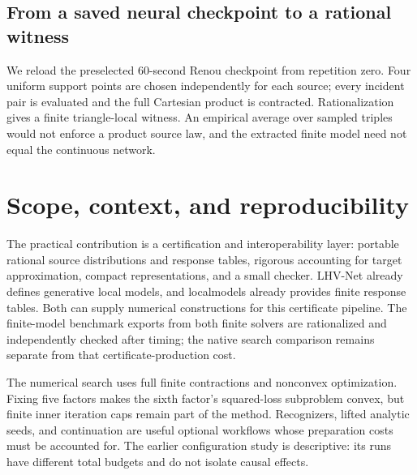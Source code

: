 \documentclass[10pt]{article}
\begin{document}
\newpage
\subsection*{From a saved neural checkpoint to a rational witness}
We reload the preselected 60-second Renou checkpoint from repetition zero.
Four uniform support points are chosen independently for each source; every
incident pair is evaluated and the full Cartesian product is contracted.
Rationalization gives a finite triangle-local witness. An empirical average over
sampled triples would not enforce a product source law, and the extracted
finite model need not equal the continuous network.

\begin{table}[H]
\centering\small

\caption{Native neural evaluation, finite extraction, and subsequent polishing
are distinct objects. Finite rows report the original-target bound $U$.
Random controls use the same four-symbol cardinalities and two-second
polishing budget. Training, extraction, rationalization and checking costs
are recorded separately.}
\label{tab:extraction}
\end{table}

\section{Scope, context, and reproducibility}
The practical contribution is a certification and interoperability layer:
portable rational source distributions and response tables, rigorous accounting
for target approximation, compact representations, and a small checker.
LHV-Net already defines generative local models, and localmodels already
provides finite response tables. Both can supply numerical constructions for
this certificate pipeline. The finite-model benchmark exports from both finite
solvers are rationalized and independently checked after timing; the native
search comparison remains separate from that certificate-production cost.



The numerical search uses full finite contractions and nonconvex optimization.
Fixing five factors makes the sixth factor's squared-loss subproblem convex,
but finite inner iteration caps remain part of the method. Recognizers, lifted
analytic seeds, and continuation are useful optional workflows whose preparation
costs must be accounted for. The earlier configuration study is descriptive:
its runs have different total budgets and do not isolate causal effects.
\begin{table}[H]
\centering\small

\caption{Illustrative earlier EJM source configurations at $v=0.80$.
Both polishing variants branch from the same seeded L-BFGS model. Additional
and total times are separated. The residual is to the stored target.}
\end{table}
\end{document}

